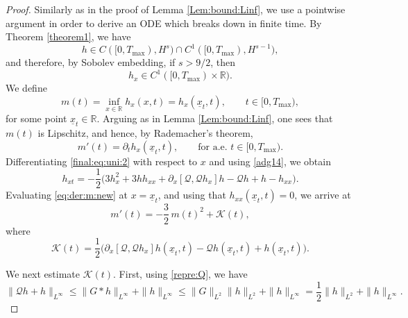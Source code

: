 \documentclass[final,11pt,a4paper,reqno]{amsart}
\newcommand{\RR}{\mathbb R}
\theoremstyle{definition}
\begin{document}
\begin{proof}
Similarly as in the proof of Lemma \ref{Lem:bound:Linf}, we use a pointwise argument in order to derive an ODE which breaks down in finite time. By Theorem \ref{theorem1}, we have
\[
h\in C([0,T_{\max}),H^s)\cap C^1([0,T_{\max}),H^{s-1}),
\]
and therefore, by Sobolev embedding, if \(s>9/2\), then
\[
h_x\in C^1([0,T_{\max})\times \RR).
\]
We define
\[
m(t)=\inf_{x\in\RR}h_x(x,t)=h_x(\underline{x}_t,t), \qquad t\in[0,T_{\max}),
\]
for some point \(\underline{x}_t\in\RR\). Arguing as in Lemma \ref{Lem:bound:Linf}, one sees that \(m(t)\) is Lipschitz, and hence, by Rademacher's theorem,
\[
m'(t)=\partial_t h_x(\underline{x}_t,t), \qquad \text{for a.e. } t\in[0,T_{\max}).
\]
Differentiating \eqref{final:eq:uni:2} with respect to \(x\) and using \eqref{adg14}, we obtain
\begin{equation}\label{eq:der:m:new}
h_{xt}
=
-\frac12\Big(3h_x^2+3hh_{xx}+\partial_x[\mathscr Q,\mathscr Q h_x]h-\mathscr Q h+h-h_{xx}\Big).
\end{equation}
Evaluating \eqref{eq:der:m:new} at \(x=\underline{x}_t\), and using that \(h_{xx}(\underline{x}_t,t)=0\), we arrive at
\begin{equation}\label{evol:min:new}
m'(t)=-\frac32\,m(t)^2+\mathcal K(t),
\end{equation}
where
\[
\mathcal K(t)
=
\frac12\Big(\partial_x[\mathscr Q,\mathscr Q h_x]h(\underline{x}_t,t)-\mathscr Q h(\underline{x}_t,t)+h(\underline{x}_t,t)\Big).
\]

We next estimate \(\mathcal K(t)\). First, using \eqref{repre:Q}, we have
\begin{equation}\label{est:K1:new}
\|\mathscr Q h+h\|_{L^\infty}
\le
\|G\ast h\|_{L^\infty}+\|h\|_{L^\infty}
\le
\|G\|_{L^2}\|h\|_{L^2}+\|h\|_{L^\infty}
=
\frac12\|h\|_{L^2}+\|h\|_{L^\infty}.
\end{equation}


\end{proof}
\end{document}
